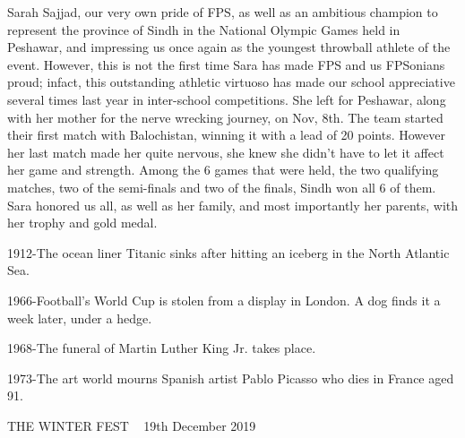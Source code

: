 \documentclass{article}
\begin{document}
\begin{multicols}{2}

Sarah Sajjad, our very own pride of FPS, as well as an ambitious champion to represent the province of Sindh in the National Olympic Games held in Peshawar, and impressing us once again as the youngest throwball athlete of the event. However, this is not the first time Sara has made FPS and us FPSonians proud; infact, this outstanding athletic virtuoso has made our school appreciative several times last year in inter-school competitions. She left for Peshawar, along with her mother for the nerve wrecking journey, on Nov, 8th. The team started their first match with Balochistan, winning it with a lead of 20 points. However her last match made her quite nervous, she knew she didn’t have to let it affect her game and strength. Among the 6 games that were held, the two qualifying matches, two of the semi-finals and two of the finals, Sindh won all 6 of them. Sara honored us all, as well as her family, and most importantly her parents, with her trophy and gold medal.  
\end{multicols}
\closearticle
\pagebreak


\begin{multicols}{2}

1912-The ocean liner Titanic sinks after hitting an iceberg in the North Atlantic Sea.

1966-Football’s World Cup is stolen from a display in London. A dog finds it a week later, under a hedge.

1968-The funeral of Martin Luther King Jr. takes place.

1973-The art world mourns Spanish artist Pablo Picasso who dies in France aged 91.
\closearticle

THE WINTER FEST ~ 19th December 2019

\pagebreak


\end{multicols}
\end{document}
